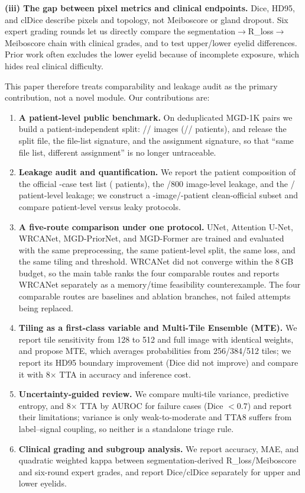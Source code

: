 \textbf{(iii) The gap between pixel metrics and clinical endpoints.} Dice, HD95, and clDice describe pixels and topology, not Meiboscore or gland dropout. Six expert grading rounds let us directly compare the segmentation$\to$R\_loss$\to$Meiboscore chain with clinical grades, and to test upper/lower eyelid differences. Prior work often excludes the lower eyelid because of incomplete exposure, which hides real clinical difficulty.

This paper therefore treats comparability and leakage audit as the primary contribution, not a novel module. Our contributions are:

\begin{enumerate}[label=(\arabic*)]
\item \textbf{A patient-level public benchmark.} On \nTotal{} deduplicated MGD-1K pairs we build a patient-independent split: \nTrain/\nVal/\nTest{} images (\nTrainPatients/\nValPatients/\nTestPatients{} patients), and release the split file, the file-list signature, and the assignment signature, so that ``same file list, different assignment'' is no longer untraceable.
\item \textbf{Leakage audit and quantification.} We report the patient composition of the official \officialTestImages-case test list (\officialTestPatients{} patients), the \officialLeakImages/800{} image-level leakage, and the \officialLeakPatients/\officialTestPatients{} patient-level leakage; we construct a \cleanOfficialImages-image/\cleanOfficialPatients-patient clean-official subset and compare patient-level versus leaky protocols.
\item \textbf{A five-route comparison under one protocol.} UNet, Attention U-Net, WRCANet, MGD-PriorNet, and MGD-Former are trained and evaluated with the same preprocessing, the same patient-level split, the same loss, and the same tiling and threshold. WRCANet did not converge within the 8\,GB budget, so the main table ranks the four comparable routes and reports WRCANet separately as a memory/time feasibility counterexample. The four comparable routes are baselines and ablation branches, not failed attempts being replaced.
\item \textbf{Tiling as a first-class variable and Multi-Tile Ensemble (MTE).} We report tile sensitivity from 128 to 512 and full image with identical weights, and propose MTE, which averages probabilities from 256/384/512 tiles; we report its HD95 boundary improvement (Dice did not improve) and compare it with 8$\times$ TTA in accuracy and inference cost.
\item \textbf{Uncertainty-guided review.} We compare multi-tile variance, predictive entropy, and 8$\times$ TTA by AUROC for failure cases (Dice $<0.7$) and report their limitations; variance is only weak-to-moderate and TTA8 suffers from label--signal coupling, so neither is a standalone triage rule.
\item \textbf{Clinical grading and subgroup analysis.} We report accuracy, MAE, and quadratic weighted kappa between segmentation-derived R\_loss/Meiboscore and six-round expert grades, and report Dice/clDice separately for upper and lower eyelids.
\end{enumerate}

